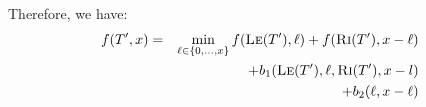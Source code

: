 \documentclass[9pt]{sigcomm-alternate}
\newcommand{\maciek}[1]{\textcolor{brown}{maciek: #1}}
\newcommand{\CostTrans}{\ensuremath{b_1}}
\newcommand{\CostCom}{\ensuremath{b_2}}
\begin{document}


%

Therefore, we have:
\begin{eqnarray*}
f(T', x) &=& \min_{\ell \in \{0, \ldots, x\}}  f(\textsc{Le}(T'), {\ell}) + f(\textsc{Ri}(T'), x - {\ell}) \\
&&+ \CostTrans(\textsc{Le}(T'),{\ell},\textsc{Ri}(T'),x-l)\\ &&+ \CostCom({\ell},x-{\ell})\\
\end{eqnarray*}
\end{document}
